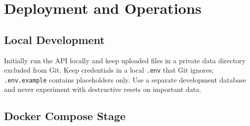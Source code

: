 \documentclass[11pt,a4paper]{report}
\begin{document}
\chapter{Deployment and Operations}\label{ch:deploy}
\section{Local Development}
Initially run the API locally and keep uploaded files in a private data directory excluded from Git. Keep credentials in a local \texttt{.env} that Git ignores; \texttt{.env.example} contains placeholders only. Use a separate development database and never experiment with destructive resets on important data.

\section{Docker Compose Stage}
\end{document}
